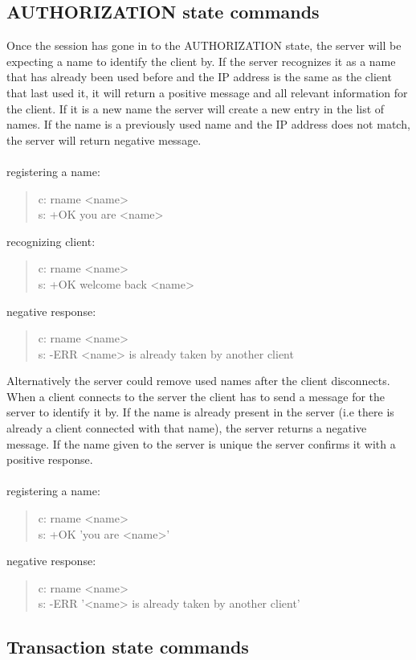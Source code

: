 \documentclass[a4paper,11pt]{article}
\begin{document}
\subsection{AUTHORIZATION state commands}
Once the session has gone in to the AUTHORIZATION state, the server will be expecting a name to identify the client by. If the server recognizes it as a name that has already been used before and the IP address is the same as the client that last used it, it will return a positive message and all relevant information for the client. If it is a new name the server will create a new entry in the list of names. If the name is a previously used name and the IP address does not match, the server will return negative message.\\\\
registering a name:
\begin{quote}
  c: rname <name>\\
  s: +OK you are <name>
\end{quote}
\noindent
recognizing client:
\begin{quote}
  c: rname <name>\\
  s: +OK welcome back <name>
\end{quote}
\noindent
negative response:
\begin{quote}
  c: rname <name>\\
  s: -ERR <name> is already taken by another client
\end{quote}


Alternatively the server could remove used names after the client disconnects. When a client connects to the server the client has to send a message for the server to identify it by. If the name is already present in the server (i.e there is already a client connected with that name), the server returns a negative message. If the name given to the server is unique the server confirms it with a positive response.\\\\
registering a name:

\begin{quote}
  c: rname <name>\\
  s: +OK 'you are <name>'
\end{quote}
\noindent
negative response:
\begin{quote}
  c: rname <name>\\
  s: -ERR '<name> is already taken by another client'
\end{quote}


\clearpage
\subsection{Transaction state commands}
\end{document}
